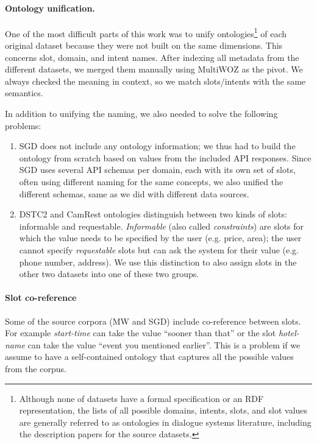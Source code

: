 \paragraph{Ontology unification.}   
One of the most difficult parts of this work was to unify ontologies\footnote{Although none of datasets have a formal specification or an RDF representation, the lists of all possible domains, intents, slots, and slot values are generally referred to as ontologies in dialogue systems literature, including the description papers for the source datasets.} of each original dataset because they were not built on the same dimensions.
This concerns slot, domain, and intent names. After indexing all metadata from the different datasets, we merged them manually using MultiWOZ as the pivot.
We always checked the meaning in context, so we match slots/intents with the same semantics.

In addition to unifying the naming, we also needed to solve the following problems:
\begin{enumerate}
    \item SGD does not include any ontology information; we thus had to build the ontology from scratch based on values from the included API responses. Since SGD uses several API schemas per domain, each with its own set of slots, often using different naming for the same concepts, we also unified the different schemas, same as we did with different data sources.

    \item DSTC2 and CamRest ontologies distinguish between two kinds of slots: informable and requestable. \emph{Informable} (also called \emph{constraints}) are slots for which the value needs to be specified by the user (e.g. price, area); the user cannot specify \emph{requestable} slots but can ask the system for their value (e.g. phone number, address). We use this distinction to also assign slots in the other two datasets into one of these two groups.

\end{enumerate}

\paragraph{Slot co-reference}
Some of the source corpora (MW and SGD) include co-reference between slots.
For example \textit{start-time} can take the value “sooner than that” or the slot \emph{hotel-name} can take the value “event you mentioned earlier”.
This is a problem if we assume to have a self-contained ontology that captures all the possible values from the corpus.


